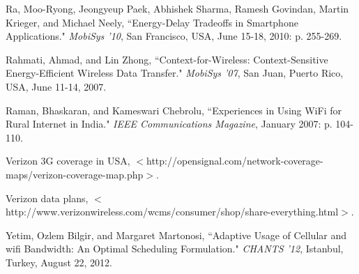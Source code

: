 \documentclass[12pt, fleqn]{article}
\begin{document}
\begin{thebibliography}{9}
    Ra, Moo-Ryong, Jeongyeup Paek, Abhishek Sharma, Ramesh Govindan, Martin Krieger,
    and Michael Neely,
    ``Energy-Delay Tradeoffs in Smartphone Applications."
    \emph{MobiSys '10},
    San Francisco, USA,
    June 15-18, 2010:
    p. 255-269.
    
    Rahmati, Ahmad, and Lin Zhong,
    ``Context-for-Wireless: Context-Sensitive Energy-Efficient Wireless Data 
    Transfer."
    \emph{MobiSys '07},
    San Juan, Puerto Rico, USA,
    June 11-14, 2007.
    
    Raman, Bhaskaran, and Kameswari Chebrolu,
    ``Experiences in Using WiFi for Rural Internet in India."
    \emph{IEEE Communications Magazine},
    January 2007: 
    p. 104-110.  
     
    Verizon 3G coverage in USA,
    $<$http://opensignal.com/network-coverage-maps/verizon-coverage-map.php$>$.
    
    Verizon data plans,
    $<$http://www.verizonwireless.com/wcms/consumer/shop/share-everything.html$>$.
  
    Yetim, Ozlem Bilgir, and Margaret Martonosi,
    ``Adaptive Usage of Cellular and wifi Bandwidth: An Optimal Scheduling Formulation."  
    \emph{CHANTS '12}, 
    Istanbul, Turkey, 
    August 22, 2012.
  
\end{thebibliography}
\end{document}
